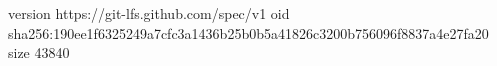 version https://git-lfs.github.com/spec/v1
oid sha256:190ee1f6325249a7cfc3a1436b25b0b5a41826c3200b756096f8837a4e27fa20
size 43840
